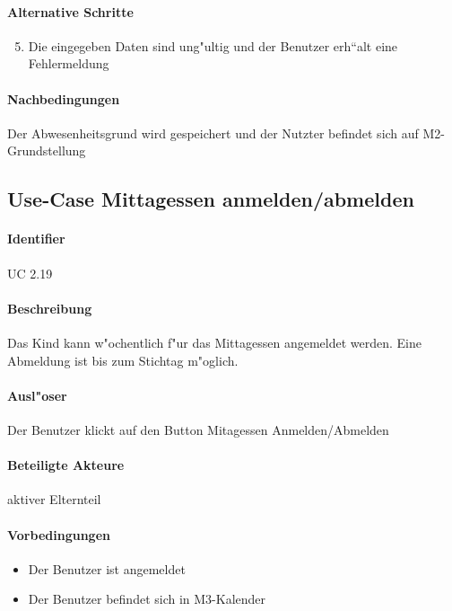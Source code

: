   \paragraph{Alternative Schritte}
  \begin{enumerate}
  \setcounter{enumi}{4}
   \item Die eingegeben Daten sind ung"ultig und der Benutzer erh``alt eine Fehlermeldung
  \end{enumerate}

  \paragraph{Nachbedingungen}
  Der Abwesenheitsgrund wird gespeichert und der Nutzter befindet sich auf M2-Grundstellung

  
  \newpage
 \subsection{Use-Case Mittagessen anmelden/abmelden}
  \paragraph{Identifier}
  UC 2.19
  \paragraph{Beschreibung}
  Das Kind kann w"ochentlich f"ur das Mittagessen angemeldet werden. Eine Abmeldung ist bis zum Stichtag m"oglich.
  \paragraph{Ausl"oser}
  Der Benutzer klickt auf den Button Mitagessen Anmelden/Abmelden
  \paragraph{Beteiligte Akteure}   \leavevmode \newline
    aktiver Elternteil
  \paragraph{Vorbedingungen}
  \begin{itemize}
   \item Der Benutzer ist angemeldet
   \item Der Benutzer befindet sich in M3-Kalender
  \end{itemize}

